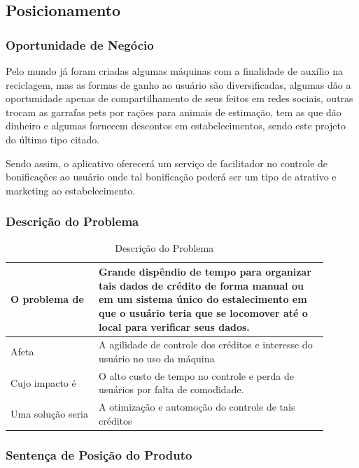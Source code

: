 \begin{apendicesenv}
\subsection{Posicionamento}

\subsubsection{Oportunidade de Negócio}
Pelo mundo já foram criadas algumas máquinas com a finalidade de auxílio na reciclagem, mas as formas de ganho ao usuário são diversificadas, algumas dão a oportunidade apenas de compartilhamento de seus feitos em redes sociais, outras trocam as garrafas pets por rações para animais de estimação, tem as que dão dinheiro e algumas fornecem descontos em estabelecimentos, sendo este projeto do último tipo citado.

Sendo assim, o aplicativo oferecerá um serviço de facilitador no controle de bonificações ao usuário onde tal bonificação poderá ser um tipo de atrativo e marketing ao estabelecimento.

\subsubsection{Descrição do Problema}

\begin{table}[htp]
    \centering
    \caption{Descrição do Problema}
    \label{my-label}
    \begin{tabular}{|p{0.25\linewidth}|p{0.65\linewidth}|}
        \hline
        O problema de     & Grande dispêndio de tempo para organizar tais dados de crédito de forma manual ou em um sistema único do estalecimento em que o usuário teria que se locomover até o local para verificar seus dados. \\ \hline
        Afeta             & A agilidade de controle dos créditos e interesse do usuário no uso da máquina \\ \hline
        Cujo impacto é    & O alto custo de tempo no controle e perda de usuários por falta de comodidade. \\ \hline
        Uma solução seria & A otimização e automoção do controle de tais créditos \\ \hline
    \end{tabular}
\end{table}

\subsubsection{Sentença de Posição do Produto}


\end{apendicesenv}
